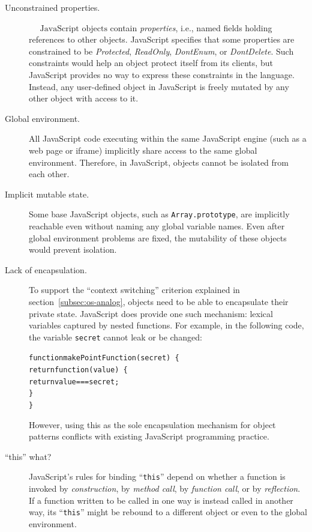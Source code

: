 \documentclass[letterpaper,twocolumn,10pt]{article}
\newcommand{\code}[1]{{\tt {#1}}}              %
\begin{document}
\begin{description}

  \item[Unconstrained properties.] $\mbox{~~~~JavaScript objects}$ contain 
  \emph{properties}, i.e., named fields holding references to other objects. 
  JavaScript specifies that some properties are constrained to be 
  \emph{Protected}, \emph{ReadOnly}, \emph{DontEnum}, or \emph{DontDelete}. 
  Such constraints would help an object protect itself from its clients, but 
  JavaScript provides no way to express these constraints in the language. 
  Instead, any user-defined object in JavaScript is freely mutated by any other 
  object with access to it.
  
  \item[Global environment.] All JavaScript code executing within the same 
  JavaScript engine (such as a web page or iframe) implicitly share access to 
  the same global environment. Therefore, in JavaScript, objects cannot be 
  isolated from each other.

  \item[Implicit mutable state.] Some base JavaScript objects, such as 
  \code{Array.prototype}, are implicitly reachable even without naming any 
  global variable names. Even after global environment problems are fixed, 
  the mutability of these objects would prevent isolation.

  \item[Lack of encapsulation.] To support the ``context switching'' 
  criterion explained in section~\ref{subsec:os-analog}, objects need 
  to be able to encapsulate their private state. JavaScript does provide 
  one such mechanism: lexical variables captured by nested functions. 
  For example, in the following code, the variable \code{secret} cannot
  leak or be changed:
\begin{alltt}
function makePointFunction(secret)\ \{
  return function(value)\ \{ 
    return value === secret;
  \}
\}  
\end{alltt}
  However, using this as the sole 
  encapsulation mechanism for object patterns conflicts with existing 
  JavaScript programming practice.

  \item[``this'' what?] JavaScript's rules for binding ``\code{this}'' depend 
  on whether a function is invoked by \emph{construction}, by \emph{method 
  call}, by \emph{function call}, or by \emph{reflection}. If a function 
  written to be called in one way is instead called in another way, its 
  ``\code{this}'' might be rebound to a different object or even to the 
  global environment.


\end{description}
\end{document}
